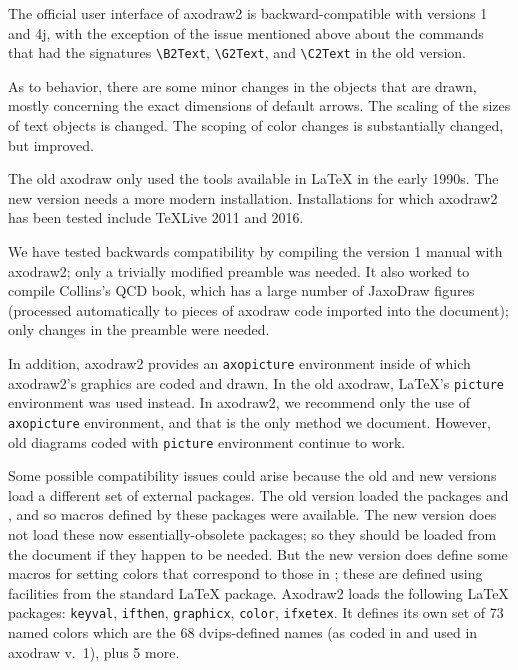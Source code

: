 \documentclass[12pt]{article}
\def\program#1{\texttt{#1}}
\begin{document}
The official user interface of axodraw2 is backward-compatible with
versions 1 and 4j, with the exception of the issue mentioned above
about the commands that had the signatures \verb+\B2Text+,
\verb+\G2Text+, and \verb+\C2Text+ in the old version.

As to behavior, there are some minor changes in the objects that are
drawn, mostly concerning the exact dimensions of default arrows. The
scaling of the sizes of text objects is changed.  The scoping of color
changes is substantially changed, but improved.

The old axodraw only used the tools available in \LaTeX{} in the early
1990s.  The new version needs a more modern installation.
Installations for which axodraw2 has been tested include TeXLive 2011
and 2016.

We have tested backwards compatibility by compiling the version 1
manual with axodraw2; only a trivially modified preamble was needed.
It also worked to compile Collins's QCD book\cite{qcdbook},
which has a large number
of JaxoDraw figures (processed automatically to pieces of axodraw code
imported into the document); only changes in the preamble were needed.

In addition, axodraw2 provides an \verb+axopicture+ environment inside
of which axodraw2's graphics are coded and drawn.  In the old axodraw,
\LaTeX's \verb+picture+ environment was used instead.  In axodraw2, we
recommend only the use of \verb+axopicture+ environment, and that is
the only method we document.  However, old diagrams coded with
\verb+picture+ environment continue to work.

Some possible compatibility issues could arise because the old and new
versions load a different set of external packages.  The old version
loaded the packages  and , and so
macros defined by these packages were available.  The new version does
not load these now essentially-obsolete packages; so they should be
loaded from the document if they happen to be needed.  But the new
version does define some macros for setting colors that correspond to
those in ; these are defined using facilities from
the standard \LaTeX{}  package.  Axodraw2 loads the
following \LaTeX{} packages: \program{keyval}, \program{ifthen},
\program{graphicx}, \program{color}, \program{ifxetex}.  It defines
its own set of 73 named colors which are the 68 dvips-defined names
(as coded in  and used in axodraw v.\ 1), plus 5
more.
\end{document}
